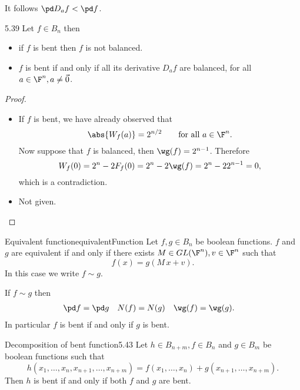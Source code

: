 \begin{oss}
	It follows \(\pd D_a f < \pd f\).
\end{oss}

\begin{teor}{}{5.39}
	Let \(f\in B_n\) then
	\begin{itemize}
		\item if \(f\) is bent then \(f\) is not balanced.
		\item \(f\) is bent if and only if all its derivative \(D_a f\) are balanced, for all \(a\in \F^n,a\neq \vec{0}\).
	\end{itemize}
\end{teor}

\begin{proof}
	\begin{itemize}
		\item  If \(f\) is bent, we have already observed that
		      \[
			      \abs{W_f(a)} = 2^{n/2} \qquad\text{for all }a \in \F^n.
		      \]
		      Now suppose that \(f\) is balanced, then \(\wg(f) = 2^{n-1}\). Therefore
		      \[
			      W_f(0) = 2^n - 2 F_f(0) = 2^n -2\wg(f) = 2^n-2 2^{n-1} = 0,
		      \]
		      which is a contradiction.
		\item Not given.
	\end{itemize}
\end{proof}

\begin{defn}{Equivalent function}{equivalentFunction}
	Let \(f,g\in B_n\) be boolean functions. \(f\) and \(g\) are equivalent if and only if there exists \(M\in GL(\F^n), v \in \F^n\) such that
	\[
		f(x) = g(M\,x+v).
	\]
	In this case we write \(f\sim g\).
\end{defn}

\begin{oss}
	If \(f\sim g\) then
	\begin{align*}
		\pd f & = \pd g & N(f) & = N(g) & \wg(f) & = \wg(g).
	\end{align*}
	In particular \(f\) is bent if and only if \(g\) is bent.
\end{oss}

\begin{teor}{Decomposition of bent function}{5.43}
	Let \(h\in B_{n+m}, f \in B_n\) and \(g\in B_m\) be boolean functions such that
	\[
		h(x_1,\ldots,x_n,x_{n+1},\ldots,x_{n+m}) = f(x_1,\ldots,x_n) + g(x_{n+1},\ldots,x_{n+m}).
	\]
	Then \(h\) is bent if and only if both \(f\) and \(g\) are bent.
\end{teor}

